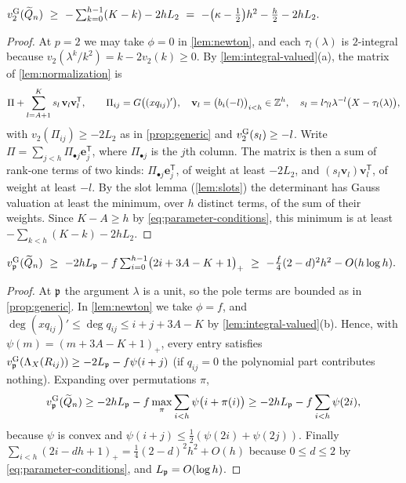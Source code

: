 \begin{proposition}\label{prop:two}
$\vg2(\Qt_n)\ \ge\ -\sum_{k=0}^{h-1}(K-k)-2hL_2\ =\ -\bigl(\kappa-\tfrac12\bigr)h^2-\tfrac h2-2hL_2 .$
\end{proposition}

\begin{proof}
At $p=2$ we may take $\phi=0$ in \cref{lem:newton}, and each $\tau_l(\lambda)$ is $2$-integral because $v_2(\lambda^k/k^2)=k-2v_2(k)\ge0$. By \cref{lem:integral-valued}(a), the matrix of \cref{lem:normalization} is
\[
\Pi+\sum_{l=A+1}^{K}s_l\,\mathbf v_l\mathbf v_l^{\mathsf T},\qquad \Pi_{ij}=G\bigl((xq_{ij})'\bigr),\quad \mathbf v_l=\bigl(b_i(-l)\bigr)_{i<h}\in\mathbb{Z}^h,\quad s_l=l\gamma_l\lambda^{-l}\bigl(X-\tau_l(\lambda)\bigr),
\]
with $v_2(\Pi_{ij})\ge-2L_2$ as in \cref{prop:generic} and $v^{\mathrm{G}}_{2}(s_l)\ge-l$. Write $\Pi=\sum_{j<h}\Pi_{\bullet j}\mathbf e_j^{\mathsf T}$, where $\Pi_{\bullet j}$ is the $j$th column. The matrix is then a sum of rank-one terms of two kinds: $\Pi_{\bullet j}\mathbf e_j^{\mathsf T}$, of weight at least $-2L_2$, and $(s_l\mathbf v_l)\mathbf v_l^{\mathsf T}$, of weight at least $-l$. By the slot lemma (\cref{lem:slots}) the determinant has Gauss valuation at least the minimum, over $h$ distinct terms, of the sum of their weights. Since $K-A\ge h$ by \eqref{eq:parameter-conditions}, this minimum is at least $-\sum_{k<h}(K-k)-2hL_2$.
\end{proof}

\begin{proposition}\label{prop:P}
$\vg\pP(\Qt_n)\ \ge\ -2hL_{\pP}-f\sum_{i=0}^{h-1}\bigl(2i+3A-K+1\bigr)_+\ \ge\ -\tfrac f4(2-d)^2h^2-O(h\log h).$
\end{proposition}

\begin{proof}
At $\mathfrak{p}$ the argument $\lambda$ is a unit, so the pole terms are bounded as in \cref{prop:generic}. In \cref{lem:newton} we take $\phi=f$, and $\deg(xq_{ij})'\le\deg q_{ij}\le i+j+3A-K$ by \cref{lem:integral-valued}(b). Hence, with $\psi(m)=(m+3A-K+1)_+$, every entry satisfies $v^{\mathrm{G}}_{\mathfrak{p}}(\Lambda_X(R_{ij}))\ge-2L_{\mathfrak{p}}-f\psi(i+j)$ (if $q_{ij}=0$ the polynomial part contributes nothing). Expanding over permutations $\pi$,
\[
v^{\mathrm{G}}_{\mathfrak{p}}(\widetilde{Q}_n)\ge-2hL_{\mathfrak{p}}-f\max_\pi\sum_{i<h}\psi\bigl(i+\pi(i)\bigr)\ge-2hL_{\mathfrak{p}}-f\sum_{i<h}\psi(2i),
\]
because $\psi$ is convex and $\psi(i+j)\le\frac12(\psi(2i)+\psi(2j))$. Finally $\sum_{i<h}(2i-dh+1)_+=\frac14(2-d)^2h^2+O(h)$ because $0\le d\le2$ by \eqref{eq:parameter-conditions}, and $L_{\mathfrak{p}}=O(\log h)$.
\end{proof}

